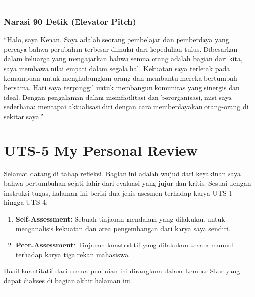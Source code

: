 \documentclass[
  letterpaper,
  DIV=11,
  numbers=noendperiod]{scrreprt}
\providecommand{\tightlist}{%
  \setlength{\itemsep}{0pt}\setlength{\parskip}{0pt}}
\begin{document}
\begin{center}\rule{0.5\linewidth}{0.5pt}\end{center}

\subsection{Narasi 90 Detik (Elevator
Pitch)}\label{narasi-90-detik-elevator-pitch}

``Halo, saya Kenan. Saya adalah seorang pembelajar dan pemberdaya yang
percaya bahwa perubahan terbesar dimulai dari kepedulian tulus.
Dibesarkan dalam keluarga yang mengajarkan bahwa semua orang adalah
bagian dari kita, saya membawa nilai empati dalam segala hal. Kekuatan
saya terletak pada kemampuan untuk menghubungkan orang dan membantu
mereka bertumbuh bersama. Hati saya terpanggil untuk membangun komunitas
yang sinergis dan ideal. Dengan pengalaman dalam memfasilitasi dan
berorganisasi, misi saya sederhana: mencapai aktualisasi diri dengan
cara memberdayakan orang-orang di sekitar saya.''


\chapter{UTS-5 My Personal Review}\label{uts-5-my-personal-review}

Selamat datang di tahap refleksi. Bagian ini adalah wujud dari keyakinan
saya bahwa pertumbuhan sejati lahir dari evaluasi yang jujur dan kritis.
Sesuai dengan instruksi tugas, halaman ini berisi dua jenis asesmen
terhadap karya UTS-1 hingga UTS-4:

\begin{enumerate}
\def\labelenumi{\arabic{enumi}.}
\tightlist
\item
  \textbf{Self-Assessment:} Sebuah tinjauan mendalam yang dilakukan
  untuk menganalisis kekuatan dan area pengembangan dari karya saya
  sendiri.
\item
  \textbf{Peer-Assessment:} Tinjauan konstruktif yang dilakukan secara
  manual terhadap karya tiga rekan mahasiswa.
\end{enumerate}

Hasil kuantitatif dari semua penilaian ini dirangkum dalam Lembar Skor
yang dapat diakses di bagian akhir halaman ini.

\begin{center}\rule{0.5\linewidth}{0.5pt}\end{center}
\end{document}
